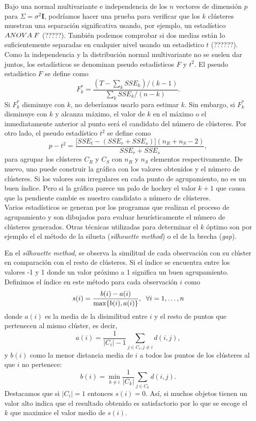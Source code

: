 \documentclass[a4paper, 20pt]{article}
\begin{document}
Bajo una normal multivariante e independencia de los $ n $ vectores de dimensión $ p $ para $ \Sigma = \sigma^2 \textbf{I} $, podríamos hacer una prueba para verificar que los $ k $ clústeres muestran una separación significativa usando, por ejemplo, un estadístico $ ANOVA\hspace{1mm} F $ (?????). También podemos comprobar si dos medias están lo suficientemente separadas en cualquier nivel usando un estadístico $ t $ (??????). Como la independencia y la distribución normal multivariante no se suelen dar juntos, los estadísticos se denominan pseudo estadísticos $ F $ y  $ t^2 $. El pseudo estadístico $ F $ se define como
\[
F^*_k = \frac{(T-\sum_k SSE_k) / (k-1)}{\sum_k SSE_k / (n-k)}.
\]
Si $ F^*_k $ disminuye con $ k $, no deberíamos usarlo para estimar $ k $. Sin embargo, si $ F^*_k $ disminuye con $ k $ y alcanza máximo, el valor de $ k $ en el máximo o el inmediatamente anterior al punto será el candidato del número de clústeres. Por otro lado, el pseudo estadístico $ t^2 $ se define como
\[
p-t^2 = \frac{\lbrack SSE_t - (SSE_r + SSE_s)\rbrack(n_R + n_S - 2)}{SSE_r + SSE_s},
\]
para agrupar los clústeres $ C_R $ y $ C_S $ con $ n_R $ y $ n_S $ elementos respectivamente. De nuevo, uno puede construir la gráfica con los valores obtenidos y el número de clústeres. Si los valores son irregulares en cada punto de agrupamiento, no es un buen índice. Pero si la gráfica parece un palo de hockey el valor $ k +1 $ que causa que la pendiente cambie es nuestro candidato a número de clústeres. \\

Varios estadísticos se generan por los programas que realizan el proceso de agrupamiento y son dibujados para evaluar heurísticamente el número de clústeres generados. Otras técnicas utilizadas para determinar el $ k $ óptimo son por ejemplo el el método de la silueta (\textit{silhouette method}) o el de la brecha (\textit{gap}).

En el \textit{silhouette method}, se observa la similitud de cada observación con su clúster en comparación con el resto de clústeres. Si el índice se encuentra entre los valores -1 y 1 donde un valor próximo a 1 significa un buen agrupamiento. Definimos el índice en este método para cada observación $ i $ como
\[
s(i) = \frac{b(i)-a(i)}{\max\{b(i), a(i)\}}, \hspace{2mm} \forall i = 1, \dots, n
\] 
donde $ a(i) $ es la media de la disimilitud entre $ i $ y el resto de puntos que pertenecen al mismo clúster, es decir,
\[
a(i) = \frac{1}{|C_i|-1}\sum_{j\in C_i, j \neq i} d(i,j),
\]
y $ b(i) $ como la menor distancia media de $ i $ a todos los puntos de los clústeres al que $ i $ no pertenece:
\[
b(i) = \min_{k \neq i} \frac{1}{|C_k|} \sum_{j \in C_k} d(i,j).
\] 
Destacamos que si $ |C_i| = 1 $ entonces $ s(i) = 0 $. Así, si muchos objetos tienen un valor alto indica que el resultado obtenido es satisfactorio por lo que se escoge el $ k $ que maximice el valor medio de $ s(i) $. \\
\end{document}
